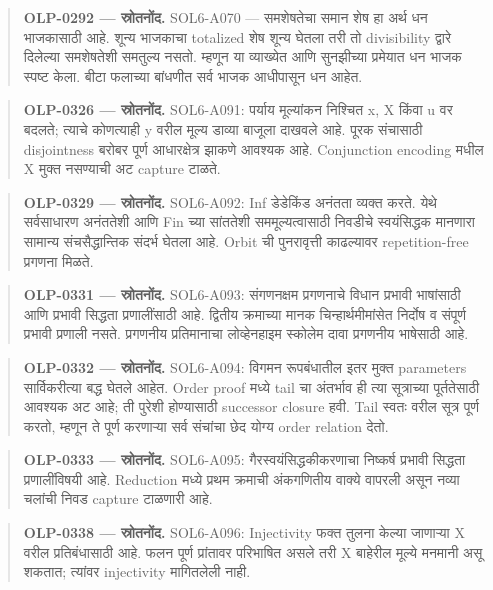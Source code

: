 \begin{quote}\small\textbf{OLP-0292 — स्रोतनोंद.} SOL6-A070 — समशेषतेचा समान शेष हा अर्थ धन भाजकासाठी आहे. शून्य भाजकाचा totalized शेष शून्य घेतला तरी तो divisibility द्वारे दिलेल्या समशेषतेशी समतुल्य नसतो. म्हणून या व्याख्येत आणि सुनझीच्या प्रमेयात धन भाजक स्पष्ट केला. बीटा फलाच्या बांधणीत सर्व भाजक आधीपासून धन आहेत.\end{quote}
\begin{quote}\small\textbf{OLP-0326 — स्रोतनोंद.} SOL6-A091: पर्याय मूल्यांकन निश्चित x, X किंवा u वर बदलते; त्याचे कोणत्याही y वरील मूल्य डाव्या बाजूला दाखवले आहे. पूरक संचासाठी disjointness बरोबर पूर्ण आधारक्षेत्र झाकणे आवश्यक आहे. Conjunction encoding मधील X मुक्त नसण्याची अट capture टाळते.\end{quote}
\begin{quote}\small\textbf{OLP-0329 — स्रोतनोंद.} SOL6-A092: Inf डेडेकिंड अनंतता व्यक्त करते. येथे सर्वसाधारण अनंततेशी आणि Fin च्या सांततेशी सममूल्यत्वासाठी निवडीचे स्वयंसिद्धक मानणारा सामान्य संचसैद्धान्तिक संदर्भ घेतला आहे. Orbit ची पुनरावृत्ती काढल्यावर repetition-free प्रगणना मिळते.\end{quote}
\begin{quote}\small\textbf{OLP-0331 — स्रोतनोंद.} SOL6-A093: संगणनक्षम प्रगणनाचे विधान प्रभावी भाषांसाठी आणि प्रभावी सिद्धता प्रणालींसाठी आहे. द्वितीय क्रमाच्या मानक चिन्हार्थमीमांसेत निर्दोष व संपूर्ण प्रभावी प्रणाली नसते. प्रगणनीय प्रतिमानाचा लोव्हेनहाइम स्कोलेम दावा प्रगणनीय भाषेसाठी आहे.\end{quote}
\begin{quote}\small\textbf{OLP-0332 — स्रोतनोंद.} SOL6-A094: विगमन रूपबंधातील इतर मुक्त parameters सार्विकरीत्या बद्ध घेतले आहेत. Order proof मध्ये tail चा अंतर्भाव ही त्या सूत्राच्या पूर्ततेसाठी आवश्यक अट आहे; ती पुरेशी होण्यासाठी successor closure हवी. Tail स्वतः वरील सूत्र पूर्ण करतो, म्हणून ते पूर्ण करणाऱ्या सर्व संचांचा छेद योग्य order relation देतो.\end{quote}
\begin{quote}\small\textbf{OLP-0333 — स्रोतनोंद.} SOL6-A095: गैरस्वयंसिद्धकीकरणाचा निष्कर्ष प्रभावी सिद्धता प्रणालींविषयी आहे. Reduction मध्ये प्रथम क्रमाची अंकगणितीय वाक्ये वापरली असून नव्या चलांची निवड capture टाळणारी आहे.\end{quote}
\begin{quote}\small\textbf{OLP-0338 — स्रोतनोंद.} SOL6-A096: Injectivity फक्त तुलना केल्या जाणाऱ्या X वरील प्रतिबंधासाठी आहे. फलन पूर्ण प्रांतावर परिभाषित असले तरी X बाहेरील मूल्ये मनमानी असू शकतात; त्यांवर injectivity मागितलेली नाही.\end{quote}

